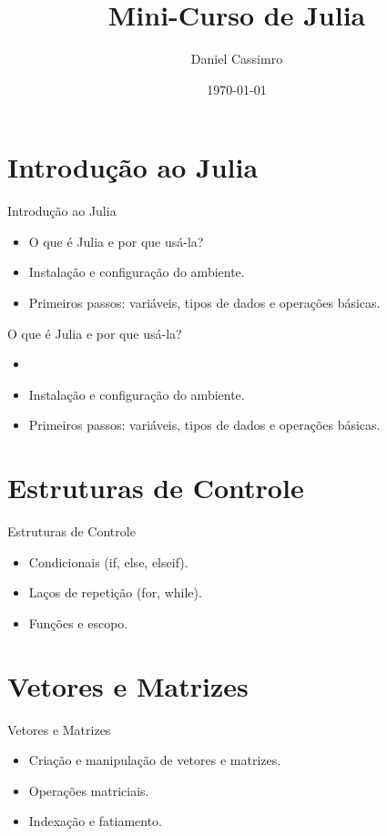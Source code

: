 \documentclass{beamer}
\title{Mini-Curso de Julia}
\author{Daniel Cassimro}
\date{\today}
\begin{document}
\frame{\titlepage}

\section{Introdução ao Julia}
\begin{frame}{Introdução ao Julia}
    \begin{itemize}
        \item O que é Julia e por que usá-la?
        \item Instalação e configuração do ambiente.
        \item Primeiros passos: variáveis, tipos de dados e operações básicas.
    \end{itemize}
\end{frame}

\begin{frame}{O que é Julia e por que usá-la?}
    \begin{itemize}
        \item 
        \item Instalação e configuração do ambiente.
        \item Primeiros passos: variáveis, tipos de dados e operações básicas.
        
        
        
        
        
    \end{itemize}
\end{frame}


\section{Estruturas de Controle}
\begin{frame}{Estruturas de Controle}
    \begin{itemize}
        \item Condicionais (if, else, elseif).
        \item Laços de repetição (for, while).
        \item Funções e escopo.
    \end{itemize}
\end{frame}

\section{Vetores e Matrizes}
\begin{frame}{Vetores e Matrizes}
    \begin{itemize}
        \item Criação e manipulação de vetores e matrizes.
        \item Operações matriciais.
        \item Indexação e fatiamento.
    \end{itemize}
\end{frame}
\end{document}

